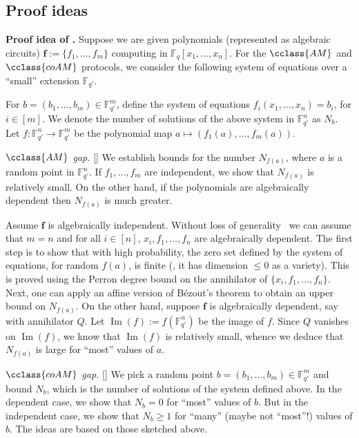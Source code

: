 \documentclass{toc}
\newcommand{\F}{\mathbb{F}}
\DeclareMathOperator{\im}{\mathrm{Im}}
\newcommand{\AM}{\cclass{AM}\xspace}  %
\newcommand{\coAM}{\cclass{coAM}\xspace}  %
\begin{document}
%
%
%


 \subsection{Proof ideas}\label{idea}
%
 
\smallskip\noindent
\textbf{Proof idea of .}  
Suppose we are given polynomials (represented as algebraic circuits) $\mathbf{f}:= \{f_1,\ldots,f_m\}$ computing in $\F_q[x_1,\dots,x_n]$. For the
$\AM$ and $\coAM$ protocols, we consider the following system of equations over a ``small'' extension $\F_{q'}$. %
%
  
 For $b=(b_1,\dots,b_m)\in \F_{q'}^m$, define the system of equations $f_i(x_1,\dots,x_n)=b_i$, for $i\in [m]$. We denote the number of solutions of the above system in $\F_{q'}^n$ as $N_b$. Let $f:\F_{q'}^n\to \F_{q'}^m$ be the polynomial map $a\mapsto (f_1(a),\dots,f_m(a))$.

 \emph{$\AM$ gap.} [] We establish bounds for the number $N_{f(a)}$, where $a$ is a random point in $\F_{q'}^n$. If $f_1,\dots,f_m$ are independent, we show that  $N_{f(a)}$ is relatively small.
%
On the other hand,   %
if the polynomials are algebraically dependent then $N_{f(a)}$ is much
%
greater.   %

Assume $\mathbf{f}$
%
is   %
algebraically independent. Without loss of generality~\cite[Section~2]{pandey2016algebraic} we can assume that $m=n$ and for all $i\in[n]$, 
%
$x_i,f_1,\ldots,f_n$ %
are algebraically dependent. 
The first step is to show that
%
 with high probability, the zero set defined by the system of equations, for random $f(a)$, is finite (\ie, it has dimension $\leq 0$ as a variety). %
%
This is proved using the Perron degree bound on the annihilator of $\{x_i,f_1,\ldots,f_n\}$. 
Next, one can apply an affine version of 
%
B\'ezout's %
theorem to
%
obtain an upper bound on   %
$N_{f(a)}$. 
On the other hand, suppose $\mathbf{f}$
%
is  %
algebraically dependent, say with annihilator $Q$. Let $\im(f):=f(\F_{q'}^n)$ be the image of $f$. Since $Q$ vanishes on $\im(f)$, we know that $\im(f)$ is relatively small, whence we deduce that $N_{f(a)}$ is large for ``most''
%
values of $a$.   %
 
\emph{$\coAM$ gap.} [] We pick a random point $b=(b_1,\dots,b_m)\in \F_{q'}^m$ and bound $N_b$, which is the number of solutions of the system defined above.
In the dependent case, we show that $N_b=0$ for ``most''
%
values of $b$.  %
But in the independent case, we show that $N_b\ge1$ for ``many''
%
(maybe   %
not ``most''!)
%
values of $b$.   %
The ideas are based on those sketched above.
%
\end{document}
